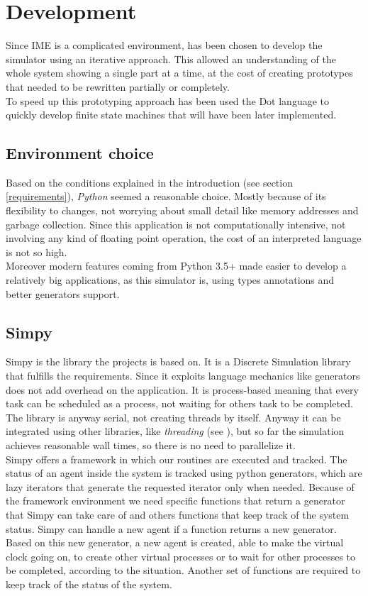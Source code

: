 
\chapter{Development}
Since IME is a complicated environment, has been chosen to develop the simulator 
using an iterative approach. This allowed an understanding of the whole system
showing a single part at a time, at the cost of creating prototypes that needed
to be rewritten partially or completely. \\
To speed up this prototyping approach has been used the Dot language \cite{dot-lang} to 
quickly develop finite state machines that will have been later implemented.

\section{Environment choice}
Based on the conditions explained in the introduction (see section
\ref{requirements}), \textit{Python} seemed a reasonable choice. Mostly because
of its flexibility to changes, not worrying about small detail like memory
addresses and garbage collection. Since this application is not computationally
intensive, not involving any kind of floating point operation, the cost of an
interpreted language is not so high. \\
Moreover modern features coming from Python 3.5+ made easier to develop a
relatively big applications, as this simulator is, using types annotations and
better generators support.

\section{Simpy}\label{simpy}
Simpy is the library the projects is based on. It is a Discrete Simulation
library that fulfills the requirements. Since it exploits language mechanics like
generators does not add overhead on the application. It is process-based
meaning that every task can be scheduled as a process, not waiting for others
task to be completed. The library is anyway serial, not creating threads by
itself. Anyway it can be integrated using other libraries, like \textit{threading} (see
\cite{threading}), but so far the simulation achieves reasonable wall times,
so there is no need to parallelize it. \\
Simpy offers a framework in which our routines are executed and tracked. The
status of an agent inside the system is tracked using python generators,
which are lazy iterators that generate the requested iterator only when needed. Because of
the framework environment we need specific functions that return a generator
that Simpy can take care of and others functions that keep track of the system status. 
Simpy can handle a new agent if a function returns a new generator. Based on
this new generator, a new agent is created, able to make the virtual clock going
on, to create other virtual processes or to wait for other processes to be
completed, according to the situation. Another set of functions are required to
keep track of the status of the system.

